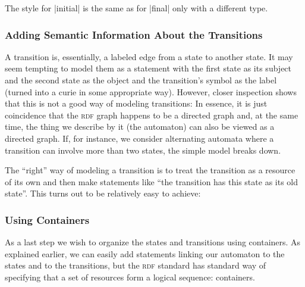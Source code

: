 The style for |initial| is the same as for |final| only with a different type.


\subsubsection{Adding Semantic Information About the Transitions}

A transition is, essentially, a labeled edge from a state to another state. It
may seem tempting to model them as a statement with the first state as its
subject and the second state as the object and the transition's symbol as the
label (turned into a curie in some appropriate way). However, closer inspection
shows that this is not a good way of modeling transitions: In essence, it is
just coincidence that the \textsc{rdf} graph happens to be a directed graph
and, at the same time, the thing we describe by it (the automaton) can also be
viewed as a directed graph. If, for instance, we consider alternating automata
where a transition can involve more than two states, the simple model breaks
down.

The ``right'' way of modeling a transition is to treat the transition as a
resource of its own and then make statements like ``the transition has this
state as its old state''. This turns out to be relatively easy to achieve:
%


\subsubsection{Using Containers}

As a last step we wish to organize the states and transitions using containers.
As explained earlier, we can easily add statements linking our automaton to the
states and to the transitions, but the \textsc{rdf} standard has standard way
of specifying that a set of resources form a logical sequence: containers.

